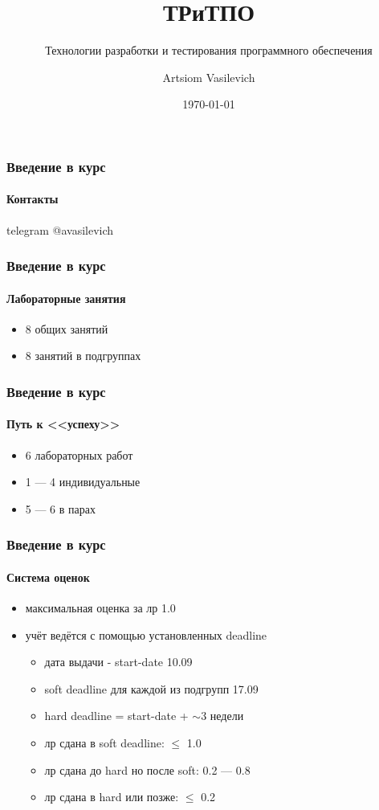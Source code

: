 \documentclass[aspectratio=169, 12pt]{beamer}
\title{ТРиТПО}
\subtitle{Технологии разработки и тестирования программного обеспечения}
\author{Artsiom Vasilevich}
\institute[BSUIR]{Belarusian State University of Informatics and Radioelectronics}
\date{\tiny \today}
\begin{document}
\frame{\titlepage}

\begin{frame}
    \frametitle{Введение в курс}
    \framesubtitle{Контакты}
    telegram
        @avasilevich
\end{frame}

\begin{frame}
    \frametitle{Введение в курс}
    \framesubtitle{Лабораторные занятия}
    \begin{itemize}
        \item 8 общих занятий
        \item 8 занятий в подгруппах
    \end{itemize}
\end{frame}

\begin{frame}
    \frametitle{Введение в курс}
    \framesubtitle{Путь к <<успеху>>}
    \begin{itemize}
        \item 6 лабораторных работ
        \item 1 --- 4 индивидуальные
        \item 5 --- 6 в парах
    \end{itemize}
\end{frame}

\begin{frame}
    \frametitle{Введение в курс}
    \framesubtitle{Система оценок}
    \begin{itemize}
        \item максимальная оценка за лр 1.0 \pause
        \item учёт ведётся с помощью установленных deadline \pause
        \begin{itemize}
            \item дата выдачи - start-date 10.09 \pause
            \item soft deadline для каждой из подгрупп 17.09 \pause
            \item hard deadline = start-date + $\sim$3 недели \pause
            \item лр сдана в soft deadline: $\leq$ 1.0
            \item лр сдана до hard но после soft: 0.2 --- 0.8
            \item лр сдана в hard или позже: $\leq$ 0.2
        \end{itemize}
    \end{itemize}
\end{frame}
\end{document}
